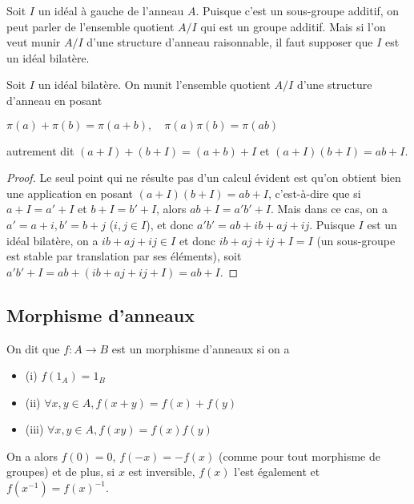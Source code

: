 \begin{rem}
Soit $I$ un idéal à gauche de l'anneau $A$. Puisque c'est un
sous-groupe additif, on peut parler de l'ensemble quotient $A/I$ qui est
un groupe additif. Mais si l'on veut munir $A/I$ d'une structure d'anneau
raisonnable, il faut supposer que $I$ est un idéal bilatère.
\end{rem}

\begin{thm}
Soit $I$ un idéal bilatère. On munit l'ensemble quotient
$A/I$ d'une structure d'anneau en posant

$\pi(a) + \pi(b) = \pi(a + b), \quad \pi(a)\pi(b) = \pi(ab)$

autrement dit $(a + I) + (b + I) = (a + b) + I$ et $(a + I)(b + I) = ab +
I$.
\end{thm}

\begin{proof}
Le seul point qui ne résulte pas d'un calcul évident est
qu'on obtient bien une application en posant $(a + I)(b + I) = ab + I$,
c'est-à-dire que si $a + I = a' + I$ et $b + I = b' + I$, alors $ab + I =
a'b' + I$. Mais dans ce cas, on a $a' = a + i, b' = b + j$ ($i,j \in I$), et
donc $a'b' = ab + ib + aj + ij$. Puisque $I$ est un idéal bilatère, on a $ib
+ aj + ij \in I$ et donc $ib + aj + ij + I = I$ (un sous-groupe est stable
par translation par ses éléments), soit $a'b' + I = ab + (ib + aj + ij +
I) = ab + I$.
\end{proof}

\subsection{Morphisme d'anneaux}

\begin{de}
On dit que $f : A \rightarrow B$ est un morphisme d'anneaux si on a

\begin{itemize}
\itemsep1pt\parskip0pt
\item
  (i) $f(1_A) = 1_B$
\item
  (ii) $\forall x,y \in A, f(x + y) = f(x) + f(y)$
\item
  (iii) $\forall x,y \in A, f(xy) = f(x)f(y)$
\end{itemize}
\end{de}

\begin{rem}
On a alors $f(0) = 0$, $f(-x) = -f(x)$ (comme pour tout
morphisme de groupes) et de plus, si $x$ est inversible, $f(x)$ l'est
également et $f(x^{-1}) = f(x)^{-1}$.
\end{rem}

